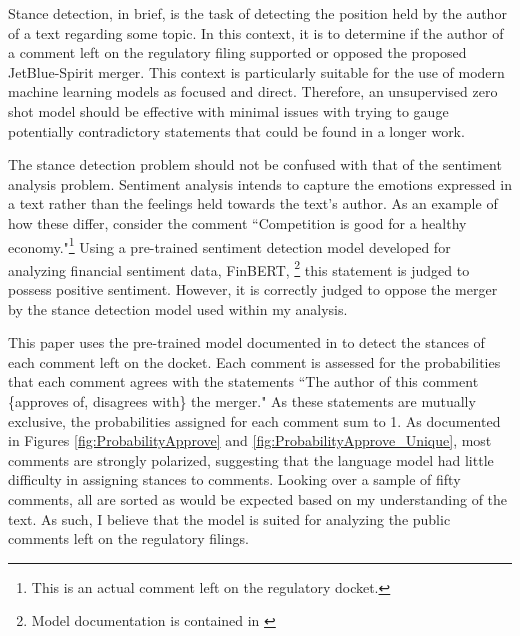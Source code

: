 \documentclass{article}
\begin{document}
\begin{appendices}
Stance detection, in brief, is the task of detecting the position held by the author of a text regarding some topic. In this context, it is to determine if the author of a comment left on the regulatory filing supported or opposed the proposed JetBlue-Spirit merger. This context is particularly suitable for the use of modern machine learning models as focused and direct. Therefore, an unsupervised zero shot model should be effective with minimal issues with trying to gauge potentially contradictory statements that could be found in a longer work. 

The stance detection problem should not be confused with that of the sentiment analysis problem. Sentiment analysis intends to capture the emotions expressed in a text rather than the feelings held towards the text's author. As an example of how these differ, consider the comment ``Competition is good for a healthy economy."\footnote{This is an actual comment left on the regulatory docket.} Using a pre-trained sentiment detection model developed for analyzing financial sentiment data, FinBERT, \footnote{Model documentation is contained in \citet{araci_finbert_2019}} this statement is judged to possess positive sentiment. However, it is correctly judged to oppose the merger by the stance detection model used within my analysis. 

This paper uses the pre-trained model documented in \citet{laurer_less_2024} to detect the stances of each comment left on the docket. Each comment is assessed for the probabilities that each comment agrees with the statements ``The author of this comment \{approves of, disagrees with\} the merger." As these statements are mutually exclusive, the probabilities assigned for each comment sum to 1. As documented in Figures \ref{fig:ProbabilityApprove} and \ref{fig:ProbabilityApprove_Unique}, most comments are strongly polarized, suggesting that the language model had little difficulty in assigning stances to comments. Looking over a sample of fifty comments, all are sorted as would be expected based on my understanding of the text. As such, I believe that the model is suited for analyzing the public comments left on the regulatory filings.  


\end{appendices}
\end{document}
